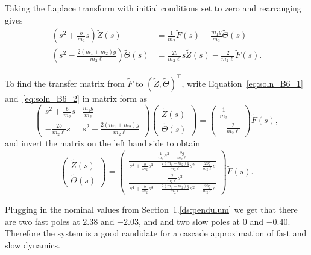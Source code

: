 Taking the Laplace transform with initial conditions set to zero and rearranging gives
\begin{align}
(s^2 + \frac{b}{m_2}s)\tilde{Z}(s) &=  \frac{1}{m_2} \tilde{F}(s) - \frac{m_1g}{m_2}\tilde{\Theta}(s) 
\label{eq:soln_B6_1}\\
(s^2 - \frac{2(m_1+m_2)g}{m_2\ell})\tilde{\Theta}(s) &= \frac{2b}{m_2\ell}s\tilde{Z}(s)-\frac{2}{m_2\ell}\tilde{F}(s).
\label{eq:soln_B6_2}
\end{align}

To find the transfer matrix from $\tilde{F}$ to $(\tilde{Z}, \tilde{\Theta})^\top$, write Equation~\eqref{eq:soln_B6_1} and~\eqref{eq:soln_B6_2} in matrix form as
\[
\left(\begin{array}{c|c}
s^2 + \frac{b}{m_2}s & \frac{m_1g}{m_2} \\\hline -\frac{2b}{m_2\ell}s & s^2 - \frac{2(m_1+m_2)g}{m_2\ell} \end{array}\right)
\begin{pmatrix}\tilde{Z}(s) \\ \tilde{\Theta}(s) \end{pmatrix} 
= \begin{pmatrix} \frac{1}{m_2} \\ -\frac{2}{m_2\ell} \end{pmatrix} \tilde{F}(s),
\]
and invert the matrix on the left hand side to obtain
\[
\begin{pmatrix}\tilde{Z}(s) \\ \tilde{\Theta}(s) \end{pmatrix} 
= \begin{pmatrix} 
\frac{\frac{1}{m_2}s^2-\frac{2g}{m_2\ell}}{s^4+\frac{b}{m_2}s^3-\frac{2(m_1+m_2)g}{m_2\ell}s^2-\frac{2b g}{m_2\ell}s}
\\ 
\frac{-\frac{2}{m_2\ell}s^2}{s^4+\frac{b}{m_2}s^3-\frac{2(m_1+m_2)g}{m_2\ell}s^2-\frac{2 b g}{m_2\ell}s}
\end{pmatrix} \tilde{F}(s).
\]

Plugging in the nominal values from Section~1.\ref{ds:pendulum} we get that there are two fast poles at $2.38$ and $-2.03$, and and two slow poles at 
$0$ and $-0.40$.  Therefore the system is a good candidate for a cascade approximation of fast and slow dynamics.

